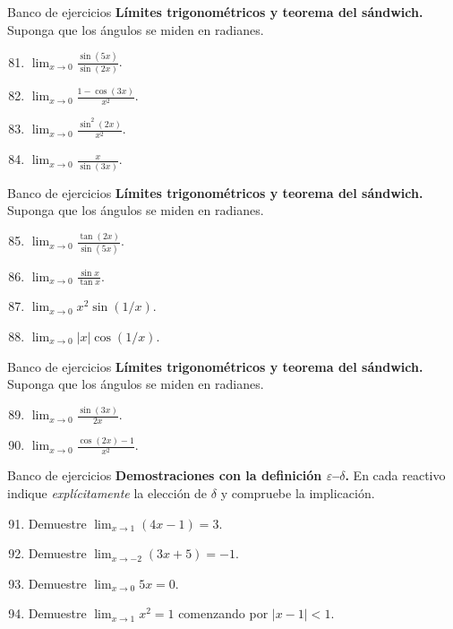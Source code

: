 \documentclass[12pt,aspectratio=169]{beamer}
\begin{document}
\begin{frame}[t,allowframebreaks]{Banco de ejercicios}
\small
\noindent \textbf{Límites trigonométricos y teorema del sándwich.} Suponga que los ángulos se miden en radianes.\par\smallskip
\begin{enumerate}\setcounter{enumi}{80}
\item $\displaystyle\lim_{x\to0}\frac{\sin(5x)}{\sin(2x)}$.
\item $\displaystyle\lim_{x\to0}\frac{1-\cos(3x)}{x^2}$.
\item $\displaystyle\lim_{x\to0}\frac{\sin^2(2x)}{x^2}$.
\item $\displaystyle\lim_{x\to0}\frac{x}{\sin(3x)}$.
\end{enumerate}
\end{frame}


\begin{frame}[t,allowframebreaks]{Banco de ejercicios}
\small
\noindent \textbf{Límites trigonométricos y teorema del sándwich.} Suponga que los ángulos se miden en radianes.\par\smallskip
\begin{enumerate}\setcounter{enumi}{84}
\item $\displaystyle\lim_{x\to0}\frac{\tan(2x)}{\sin(5x)}$.
\item $\displaystyle\lim_{x\to0}\frac{\sin x}{\tan x}$.
\item $\displaystyle\lim_{x\to0}x^2\sin(1/x)$.
\item $\displaystyle\lim_{x\to0}|x|\cos(1/x)$.
\end{enumerate}
\end{frame}


\begin{frame}[t,allowframebreaks]{Banco de ejercicios}
\small
\noindent \textbf{Límites trigonométricos y teorema del sándwich.} Suponga que los ángulos se miden en radianes.\par\smallskip
\begin{enumerate}\setcounter{enumi}{88}
\item $\displaystyle\lim_{x\to0}\frac{\sin(3x)}{2x}$.
\item $\displaystyle\lim_{x\to0}\frac{\cos(2x)-1}{x^2}$.
\end{enumerate}
\end{frame}


\begin{frame}[t,allowframebreaks]{Banco de ejercicios}
\small
\noindent \textbf{Demostraciones con la definición $\varepsilon$--$\delta$.} En cada reactivo indique \emph{explícitamente} la elección de $\delta$ y compruebe la implicación.\par\smallskip
\begin{enumerate}\setcounter{enumi}{90}
\item Demuestre $\lim_{x\to1}(4x-1)=3$.
\item Demuestre $\lim_{x\to-2}(3x+5)=-1$.
\item Demuestre $\lim_{x\to0}5x=0$.
\item Demuestre $\lim_{x\to1}x^2=1$ comenzando por $|x-1|<1$.
\end{enumerate}
\end{frame}
\end{document}
